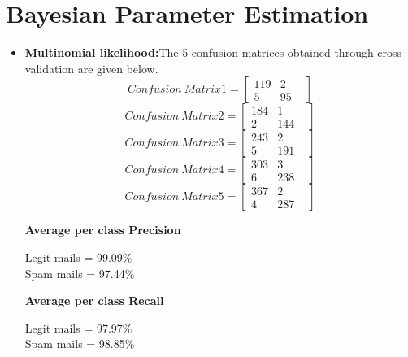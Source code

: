 \documentclass[12pt]{article}
\begin{document}
\section{Bayesian Parameter Estimation}
 \begin{itemize}
 
\item{\textbf{Multinomial likelihood:}The 5 confusion matrices obtained through cross validation are given below.
\begin{equation}
Confusion\ Matrix1 = \begin{bmatrix}119  & 2 &\\ 5 &95 \end{bmatrix}
\end{equation}
\begin{equation}
Confusion\ Matrix2 = \begin{bmatrix}184  & 1 &\\ 2 &144 \end{bmatrix}
\end{equation}
\begin{equation}
Confusion\ Matrix3 = \begin{bmatrix}243  & 2 &\\ 5 &191 \end{bmatrix}
\end{equation}
\begin{equation}
Confusion\ Matrix4 = \begin{bmatrix}303  & 3 &\\ 6 &238 \end{bmatrix}
\end{equation}
\begin{equation}
Confusion\ Matrix5 = \begin{bmatrix}367  & 2 &\\ 4 &287 \end{bmatrix}
\end{equation}

\textbf{Average per class Precision}

Legit mails = 99.09\% \\
Spam mails  = 97.44\%

\textbf{Average per class Recall}

Legit mails = 97.97\% \\
Spam mails  = 98.85\%

}




\end{itemize}
\end{document}
